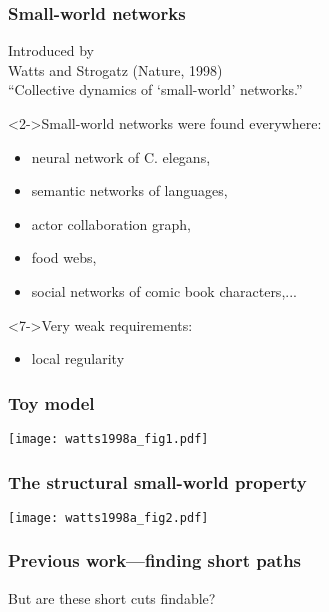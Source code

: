 \begin{frame}
  \frametitle{Small-world networks}

  Introduced by\\
  Watts and Strogatz (Nature, 1998)\cite{watts1998a}\\
  ``Collective dynamics of `small-world' networks.''

  \begin{block}<2->{Small-world networks were found everywhere:}
    \begin{itemize}
    \item<2-> neural network of C. elegans,
    \item<3-> semantic networks of languages,
    \item<4-> actor collaboration graph,
    \item<5-> food webs,
    \item<6-> social networks of comic book characters,...
    \end{itemize}
  \end{block}

  \begin{block}<7->{Very weak requirements:}
    \begin{itemize}
    \item<7-> \alert{local regularity}
    \end{itemize}
  \end{block}

  
\end{frame}

\begin{frame}
  \frametitle{Toy model}

    \texttt{[image: watts1998a\_fig1.pdf]}

\end{frame}

\begin{frame}
  \frametitle{The structural small-world property}

    \texttt{[image: watts1998a\_fig2.pdf]}

\end{frame}



\begin{frame}
  \frametitle{Previous work---finding short paths}


  But are these short cuts findable?

  \bigskip


  \bigskip


\end{frame}


